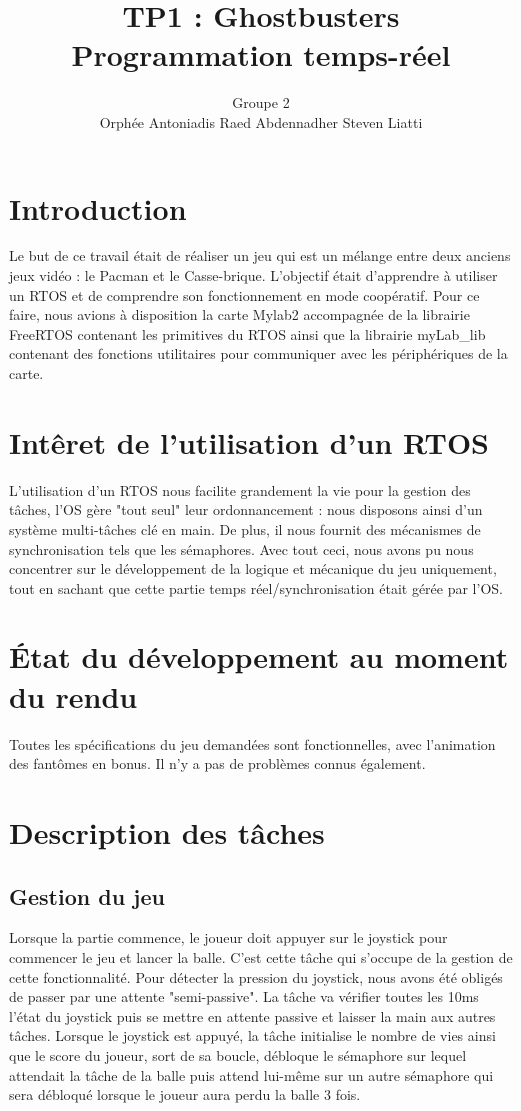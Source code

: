 \documentclass[a4paper]{article}
\title{TP1 : Ghostbusters \protect\\ Programmation temps-réel}
\author{Groupe 2 \\ Orphée Antoniadis \hspace{0.5cm} Raed Abdennadher \hspace{0.5cm} Steven Liatti}
\begin{document}
\maketitle

\section{Introduction}
Le but de ce travail était de réaliser un jeu qui est un mélange entre deux
anciens jeux vidéo : le Pacman et le Casse-brique. L'objectif était d'apprendre
à utiliser un RTOS et de comprendre son fonctionnement en mode coopératif. Pour
ce faire, nous avions à disposition la carte Mylab2 accompagnée de la librairie
FreeRTOS contenant les primitives du RTOS ainsi que la librairie myLab\_lib contenant
des fonctions utilitaires pour communiquer avec les périphériques de la carte.

\section{Intêret de l'utilisation d'un RTOS}
L'utilisation d'un RTOS nous facilite grandement la vie pour la gestion des tâches,
l'OS gère "tout seul" leur ordonnancement : nous disposons ainsi d'un système multi-tâches
clé en main. De plus, il nous fournit des mécanismes de synchronisation tels que les
sémaphores. Avec tout ceci, nous avons pu nous concentrer sur le développement de la
logique et mécanique du jeu uniquement, tout en sachant que cette partie temps réel/synchronisation
était gérée par l'OS.

\section{État du développement au moment du rendu}
Toutes les spécifications du jeu demandées sont fonctionnelles, avec l'animation des fantômes
en bonus. Il n'y a pas de problèmes connus également.

\section{Description des tâches}
\subsection{Gestion du jeu}
Lorsque la partie commence, le joueur doit appuyer sur le joystick pour
commencer le jeu et lancer la balle. C'est cette tâche qui s'occupe de la
gestion de cette fonctionnalité. Pour détecter la pression du joystick, nous avons
été obligés de passer par une attente "semi-passive". La tâche va vérifier toutes
les 10ms l'état du joystick puis se mettre en attente passive et laisser la main
aux autres tâches. Lorsque le joystick est appuyé, la tâche initialise le nombre
de vies ainsi que le score du joueur, sort de sa boucle, débloque le sémaphore
sur lequel attendait la tâche de la balle puis attend lui-même sur un autre
sémaphore qui sera débloqué lorsque le joueur aura perdu la balle 3 fois.
\end{document}
